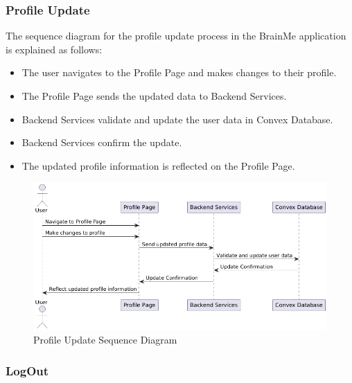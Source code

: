 \subsubsection{Profile Update}

The sequence diagram for the profile update process in the BrainMe application is explained as follows:

\begin{itemize}
    \item The user navigates to the Profile Page and makes changes to their profile.
    \item The Profile Page sends the updated data to Backend Services.
    \item Backend Services validate and update the user data in Convex Database.
    \item Backend Services confirm the update.
    \item The updated profile information is reflected on the Profile Page.
\end{itemize}


\begin{figure}[H]
    \centering
    \includegraphics[width=1\linewidth, height=0.4\textheight]{Sequence Diagrams/profile update.png}
    \caption{Profile Update Sequence Diagram}
\end{figure}

\subsubsection{LogOut}

